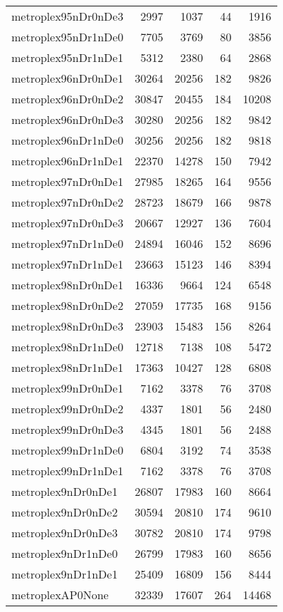 \begin{longtable}{lrrrr}
metroplex95nDr0nDe3 & 2997 & 1037 & 44 & 1916 \\
metroplex95nDr1nDe0 & 7705 & 3769 & 80 & 3856 \\
metroplex95nDr1nDe1 & 5312 & 2380 & 64 & 2868 \\
metroplex96nDr0nDe1 & 30264 & 20256 & 182 & 9826 \\
metroplex96nDr0nDe2 & 30847 & 20455 & 184 & 10208 \\
metroplex96nDr0nDe3 & 30280 & 20256 & 182 & 9842 \\
metroplex96nDr1nDe0 & 30256 & 20256 & 182 & 9818 \\
metroplex96nDr1nDe1 & 22370 & 14278 & 150 & 7942 \\
metroplex97nDr0nDe1 & 27985 & 18265 & 164 & 9556 \\
metroplex97nDr0nDe2 & 28723 & 18679 & 166 & 9878 \\
metroplex97nDr0nDe3 & 20667 & 12927 & 136 & 7604 \\
metroplex97nDr1nDe0 & 24894 & 16046 & 152 & 8696 \\
metroplex97nDr1nDe1 & 23663 & 15123 & 146 & 8394 \\
metroplex98nDr0nDe1 & 16336 & 9664 & 124 & 6548 \\
metroplex98nDr0nDe2 & 27059 & 17735 & 168 & 9156 \\
metroplex98nDr0nDe3 & 23903 & 15483 & 156 & 8264 \\
metroplex98nDr1nDe0 & 12718 & 7138 & 108 & 5472 \\
metroplex98nDr1nDe1 & 17363 & 10427 & 128 & 6808 \\
metroplex99nDr0nDe1 & 7162 & 3378 & 76 & 3708 \\
metroplex99nDr0nDe2 & 4337 & 1801 & 56 & 2480 \\
metroplex99nDr0nDe3 & 4345 & 1801 & 56 & 2488 \\
metroplex99nDr1nDe0 & 6804 & 3192 & 74 & 3538 \\
metroplex99nDr1nDe1 & 7162 & 3378 & 76 & 3708 \\
metroplex9nDr0nDe1 & 26807 & 17983 & 160 & 8664 \\
metroplex9nDr0nDe2 & 30594 & 20810 & 174 & 9610 \\
metroplex9nDr0nDe3 & 30782 & 20810 & 174 & 9798 \\
metroplex9nDr1nDe0 & 26799 & 17983 & 160 & 8656 \\
metroplex9nDr1nDe1 & 25409 & 16809 & 156 & 8444 \\
metroplexAP0None & 32339 & 17607 & 264 & 14468 \\

\end{longtable}
